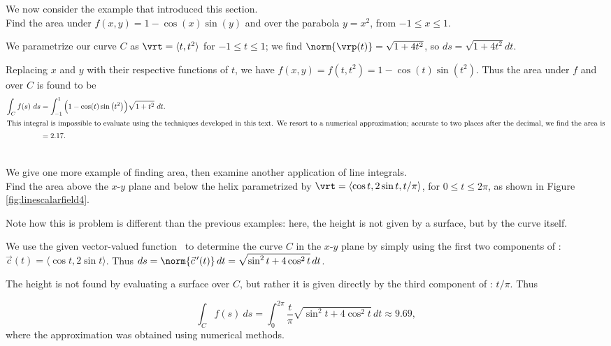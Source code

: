 We now consider the example that introduced this section.\\

{Find the area under $f(x,y) = 1-\cos(x)\sin(y)$ and over the parabola $y = x^2$, from $-1\leq x\leq 1$. }
{We parametrize our curve $C$ as $\vrt = \langle t,t^2\rangle$ for $-1\leq t\leq 1$; we find $\norm{\vrp(t)} = \sqrt{1+4t^2}$, so $ds = \sqrt{1+4t^2}dt$. 

Replacing $x$ and $y$ with their respective functions of $t$, we have $f(x,y) = f(t,t^2) = 1-\cos(t)\sin(t^2)$. Thus the area under $f$ and over $C$ is found to be
\begin{align*}
\int_C f(s)\ ds &= \int_{-1}^1 \Big(1-\cos(t)\sin\big(t^2\big)\Big)\sqrt{1+t^2}\ dt.\\
\intertext{This integral is impossible to evaluate using the techniques developed in this text. We resort to a numerical approximation; accurate to two places after the decimal, we find the area is}
 &= 2.17.
\end{align*}
}\\

We give one more example of finding area, then examine another application of line integrals.\\

{Find the area above the $x$-$y$ plane and below the helix parametrized by $\vrt = \langle \cos t,2\sin t,t/\pi\rangle$, for $0\leq t\leq 2\pi$, as shown in Figure \ref{fig:linescalarfield4}.}
{Note how this is problem is different than the previous examples: here, the height is not given by a surface, but by the curve itself. 

We use the given vector-valued function \vrt\ to determine the curve $C$ in the $x$-$y$ plane by simply using the first two components of \vrt: $\vec c(t) = \langle \cos t,2\sin t\rangle$. Thus $ds = \norm{\vec c\,'(t)}\,dt = \sqrt{\sin^2t + 4\cos^2t}\,dt$. 

The height is not found by evaluating a surface over $C$, but rather it is given directly by the third component of \vrt: $t/\pi$. Thus

$$\int_C f(s)\ ds = \int_0^{2\pi} \frac{t}{\pi}\sqrt{\sin^2t + 4\cos^2t}\,dt \approx 9.69,$$
where the approximation was obtained using numerical methods.
}\\

